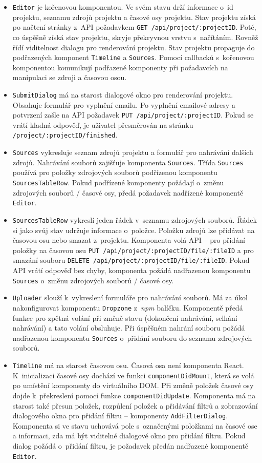 \begin{itemize}
\item \texttt{Editor} je kořenovou komponentou. Ve svém stavu drží informace o~id projektu, seznamu zdrojů projektu a časové osy projektu. Stav projektu získá po načtení stránky z~API požadavkem \texttt{GET /api/project/:projectID}. Poté, co úspěšně získá stav projektu, skryje překryvnou vrstvu s~načítáním. Rovněž řídí viditelnost dialogu pro renderování projektu. Stav projektu propaguje do podřazených komponent \texttt{Timeline} a \texttt{Sources}. Pomocí callbacků s~kořenovou komponentou komunikují podřazené komponenty při požadavcích na manipulaci se zdroji a časovou osou.
\item \texttt{SubmitDialog} má na starost dialogové okno pro renderování projektu. Obsahuje formulář pro vyplnění emailu. Po vyplnění emailové adresy a potvrzení zašle na API požadavek \texttt{PUT /api/project/:projectID}. Pokud se vrátí kladná odpověď, je uživatel přesměrován na stránku \texttt{/project/:projectID/finished}.
\item \texttt{Sources} vykresluje seznam zdrojů projektu a formulář pro nahrávání dalších zdrojů. Nahrávání souborů zajišťuje komponenta \texttt{Sources}. Třída \texttt{Sources} používá pro položky zdrojových souborů podřízenou komponentu \texttt{SourcesTableRow}. Pokud podřízené komponenty požádají o~změnu zdrojových souborů / časové osy, předá požadavek nadřízené komponentě \texttt{Editor}.
\item \texttt{SourcesTableRow} vykreslí jeden řádek v~seznamu zdrojových souborů. Řádek si jako svůj stav udržuje informace o~položce. Položku zdrojů lze přidávat na časovou osu nebo smazat z~projektu. Komponenta volá API -- pro přidání položky na časovou osu \texttt{PUT /api/project/:projectID/file/:fileID} a pro smazání souboru \texttt{DELETE /api/project/:projectID/file/:fileID}. Pokud API vrátí odpověď bez chyby, komponenta požádá nadřazenou komponentu \texttt{Sources} o~změnu zdrojových souborů / časové osy.
\item \texttt{Uploader} slouží k~vykreslení formuláře pro nahrávání souborů. Má za úkol nakonfigurovat komponentu \texttt{Dropzone} z~\textit{npm} balíčku. Komponentě předá funkce pro zpětná volání při změně stavu (dokončení nahrávání, selhání nahrávání) a tato volání obsluhuje. Při úspěšném nahrání souboru požádá nadřazenou komponentu \texttt{Sources} o~přidání souboru do seznamu zdrojových souborů.
\item \texttt{Timeline} má na starost časovou osu. Časová osa není komponenta React. K~inicializaci časové osy dochází ve funkci \texttt{componentDidMount}, která se volá po umístění komponenty do virtuálního DOM. Při změně položek časové osy dojde k~překreslení pomocí funkce \texttt{componentDidUpdate}. Komponenta má na starost také přesun položek, rozpůlení položek a přidávání filtrů a zobrazování dialogového okna pro přidání filtru -- komponenty \texttt{AddFilterDialog}. Komponenta si ve stavu uchovává pole s~označenými položkami na časové ose a informaci, zda má být viditelné dialogové okno pro přidání filtru. Pokud dialog požádá o~přidání filtru, je požadavek předán nadřazené komponentě \texttt{Editor}.

\end{itemize}
